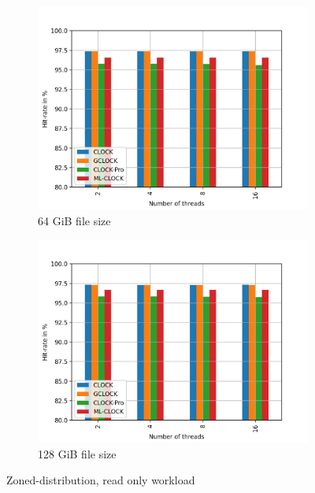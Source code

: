 \documentclass[
	12pt,
	a4paper,
	abstract,
	bibliography=totoc,
	chapterprefix,
	headings=openright,
	numbers=endperiod,
	parskip=half,
	twoside,
]{scrreprt}
\begin{document}
\begin{figure}[H]
\begin{subfigure}{0.4\textwidth}
		\includegraphics[width=\textwidth]{multi_64_gb_randread_zoned.jpg}		
		\caption{64 GiB file size}
		\label{fig:rw_90to10  zoned}
	\end{subfigure}
	\hfill
	\begin{subfigure}{0.4\textwidth}
		\includegraphics[width=\textwidth]{multi_128_gb_randread_zoned.jpg}		
		\caption{128 GiB file size}
		\label{fig:rw_90to10  uniform}
	\end{subfigure}
	\caption{Zoned-distribution, read only workload}
	\label{fig:multi zoned read only}
\end{figure}
\end{document}
